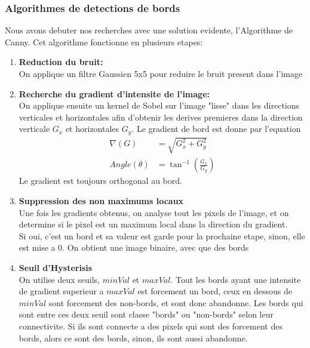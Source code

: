 \documentclass[a4paper, 12pt, titlepage, oneside]{article}
\begin{document}
	\subsubsection{Algorithmes de detections de bords}
	Nous avons debuter nos recherches avec une solution evidente, l'Algorithme de Canny. Cet algorithme fonctionne en plusieurs etapes:
	\begin{enumerate}
		\item \textbf{Reduction du bruit:}\\
			\indent On applique un filtre Gaussien 5x5 pour reduire le bruit present dans l'image
		\item \textbf{Recherche du gradient d'intensite de l'image:}\\  
		 	\indent On applique ensuite un kernel de Sobel sur l'image "lisse" dans les directions verticales et horizontales afin d'obtenir les derives premieres dans
		la direction verticale $G_x$ et horizontales $G_y$. Le gradient de bord est donne par l'equation
			\begin{align}
				\nabla (G) & = \sqrt{G_x^2 + G_y^2}\\
				Angle (\theta) & = \tan^{-1}(\frac{G_x}{G_y})
			\end{align}
		Le gradient est toujours orthogonal au bord.

		\item \textbf{Suppression des non maximums locaux}\\
			\indent Une fois les gradients obtenus, on analyse tout les pixels de l'image, et on determine si le pixel est un maximum local dans la
			direction du gradient. \\
			Si oui, c'est un bord et sa valeur est garde pour la prochaine etape, sinon, elle est mise a 0. On obtient une image binaire, avec que des bords

		\item \textbf{Seuil d'Hysterisis} \\
			\indent On utilise deux seuils, $minVal$ et $maxVal$. Tout les bords ayant une intensite de gradient superieur a $maxVal$ est forcement un
			bord, ceux en dessous de $minVal$ sont forcement des non-bords, et sont donc abandonne. Les bords qui sont entre ces deux seuil sont classe
			"bords" ou "non-bords" selon leur connectivite. Si ils sont connecte a des pixels qui sont des forcement des bords, alors ce sont des bords,
			sinon, ils sont aussi abandonne.\\
		
	\end{enumerate}
\end{document}
